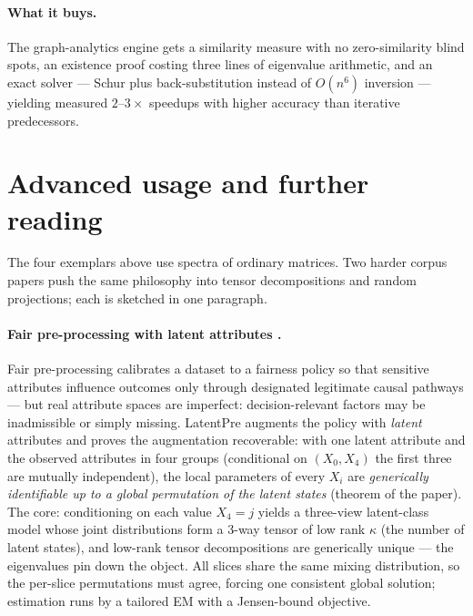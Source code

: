 \paragraph{What it buys.}
The graph-analytics engine gets a similarity measure with no zero-similarity blind spots, an existence proof costing three lines of eigenvalue
arithmetic, and an exact solver --- Schur plus back-substitution instead of $O(n^6)$ inversion --- yielding measured $2$--$3\times$ speedups with
higher accuracy than iterative predecessors.

\section{Advanced usage and further reading}
\label{sec:spec-advanced}

The four exemplars above use spectra of ordinary matrices. Two harder
corpus papers push the same philosophy into tensor decompositions and
random projections; each is sketched in one paragraph.

\paragraph{Fair pre-processing with latent attributes \citep{sigmod26-101}.}
Fair pre-processing calibrates a dataset to a fairness policy so that
sensitive attributes influence outcomes only through designated legitimate
causal pathways --- but real attribute spaces are imperfect:
decision-relevant factors may be inadmissible or simply missing. LatentPre
augments the policy with \emph{latent} attributes and proves the
augmentation recoverable: with one latent attribute and the observed
attributes in four groups (conditional on $(X_0, X_4)$ the first three are
mutually independent), the local parameters of every $X_i$ are
\emph{generically identifiable up to a global permutation of the latent
states} (theorem of the paper). The core: conditioning on each value
$X_4 = j$ yields a three-view latent-class model whose joint distributions
form a $3$-way tensor of low rank $\kappa$ (the number of latent states),
and low-rank tensor decompositions are generically unique --- the
eigenvalues pin down the object. All slices share the same mixing
distribution, so the per-slice permutations must agree, forcing one
consistent global solution; estimation runs by a tailored EM with a
Jensen-bound objective.

